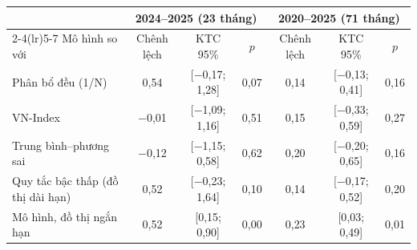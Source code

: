 \begin{tabular}{@{}lcccccc@{}}
\toprule
 & \multicolumn{3}{c}{2024--2025 (23 tháng)} & \multicolumn{3}{c}{2020--2025 (71 tháng)} \\
\cmidrule(lr){2-4}\cmidrule(lr){5-7}
Mô hình so với & Chênh lệch & KTC 95\% & $p$ & Chênh lệch & KTC 95\% & $p$ \\
\midrule
Phân bổ đều (1/N) & 0{,}54 & [$-$0{,}17; 1{,}28] & 0{,}07 & 0{,}14 & [$-$0{,}13; 0{,}41] & 0{,}16 \\
VN-Index & $-$0{,}01 & [$-$1{,}09; 1{,}16] & 0{,}51 & 0{,}15 & [$-$0{,}33; 0{,}59] & 0{,}27 \\
Trung bình--phương sai & $-$0{,}12 & [$-$1{,}15; 0{,}58] & 0{,}62 & 0{,}20 & [$-$0{,}20; 0{,}65] & 0{,}16 \\
Quy tắc bậc thấp (đồ thị dài hạn) & 0{,}52 & [$-$0{,}23; 1{,}64] & 0{,}10 & 0{,}14 & [$-$0{,}17; 0{,}52] & 0{,}20 \\
Mô hình, đồ thị ngắn hạn & 0{,}52 & [0{,}15; 0{,}90] & 0{,}00 & 0{,}23 & [0{,}03; 0{,}49] & 0{,}01 \\
\bottomrule
\end{tabular}
